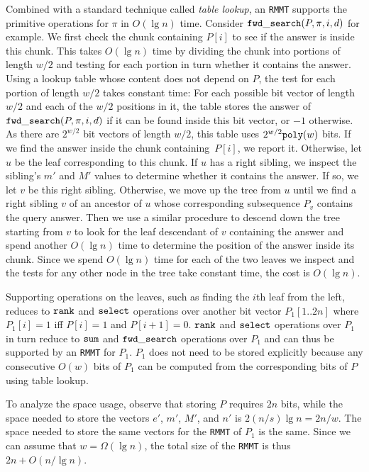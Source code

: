 Combined with a standard technique called {\em table lookup}, an {\tt RMMT}
supports the primitive operations
for $\pi$ in $O(\lg n)$ time.  Consider
$\mathtt{fwd\_search}(P,\pi,i,d)$ for example.  We first check the chunk containing $P[i]$
to see if the answer is inside this chunk.  This takes
$O(\lg n)$ time by dividing the chunk into portions of length $w/2$
and testing for each portion in turn whether it contains the answer.
Using a lookup table whose content does not
depend on $P$, the test for each portion of length $w/2$ takes
constant time: For each possible bit vector of length $w/2$ and each
of the $w/2$ positions in it, the table stores the answer
of $\mathtt{fwd\_search}(P,\pi,i,d)$ if it can be found inside this bit vector,
or $-1$ otherwise.  As there are $2^{w/2}$ bit vectors of length
$w/2$, this table uses $2^{w/2}\mathtt{poly}(w)$ bits.  If we find the answer
inside the chunk containing~$P[i]$, we report it.
Otherwise, let $u$ be the leaf corresponding to this
chunk.  If $u$ has a right sibling, we inspect the sibling's $m'$ and
$M'$ values to determine whether it contains the answer.  If so, we
let $v$ be this right sibling.  Otherwise, we move up the tree from
$u$ until we find a right sibling $v$ of an ancestor of $u$ whose
corresponding subsequence $P_v$ contains the query answer.  Then we
use a similar procedure to descend down the tree starting from $v$ to
look for the leaf descendant of $v$ containing the answer and spend
another $O(\lg n)$ time to determine the position of the answer
inside its chunk.  Since we spend $O(\lg n)$ time for each of
the two leaves we inspect and the tests for any other
node in the tree take constant time, the cost is $O(\lg n)$.

Supporting operations on the leaves, such as finding the $i$th leaf
from the left, reduces to $\mathtt{rank}$ and $\mathtt{select}$ operations over
another bit vector $P_1[1..2n]$ where $P_1[i] = 1$ iff $P[i] = 1$ and
$P[i+1] = 0$.  $\mathtt{rank}$ and $\mathtt{select}$ operations over $P_1$ in turn
reduce to $\mathtt{sum}$ and $\mathtt{fwd\_search}$ operations over $P_1$ and can thus
be supported by an {\tt RMMT} for $P_1$.  $P_1$ does not need to be
stored explicitly because any consecutive $O(w)$ bits of $P_1$ can be
computed from the corresponding bits of $P$ using table lookup.

To analyze the space usage, observe that storing $P$ requires $2n$
bits, while the space needed to store the vectors $e'$, $m'$, $M'$,
and $n'$ is $2(n/s) \lg n = 2n/w$.  The space needed to store the same
vectors for the {\tt RMMT} of $P_1$ is the same.  Since we can assume
that $w = \Omega(\lg n)$, the total size of the {\tt RMMT} is thus
$2n + O(n / \lg n)$.
